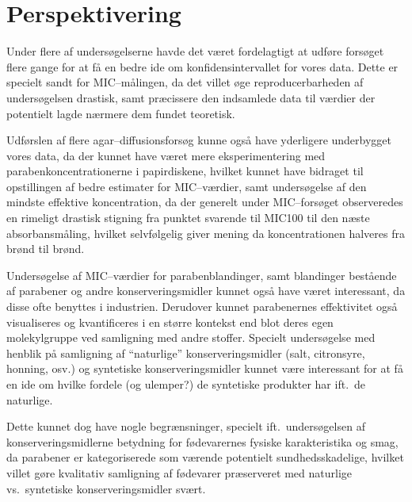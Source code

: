\section{Perspektivering}
Under flere af undersøgelserne havde det været fordelagtigt at udføre forsøget flere gange for at få en bedre ide om konfidensintervallet for vores data. Dette er specielt sandt for MIC--målingen, da det villet øge reproducerbarheden af undersøgelsen drastisk, samt præcissere den indsamlede data til værdier der potentielt lagde nærmere dem fundet teoretisk.

Udførslen af flere agar--diffusionsforsøg kunne også have yderligere underbygget vores data, da der kunnet have været mere eksperimentering med parabenkoncentrationerne i papirdiskene, hvilket kunnet have bidraget til opstillingen af bedre estimater for MIC--værdier, samt undersøgelse af den mindste effektive koncentration, da der generelt under MIC--forsøget observeredes en rimeligt drastisk stigning fra punktet svarende til MIC100 til den næste absorbansmåling, hvilket selvfølgelig giver mening da koncentrationen halveres fra brønd til brønd.

Undersøgelse af MIC--værdier for parabenblandinger, samt blandinger bestående af parabener og andre konserveringsmidler kunnet også have været interessant, da disse ofte benyttes i industrien. Derudover kunnet parabenernes effektivitet også visualiseres og kvantificeres i en større kontekst end blot deres egen molekylgruppe ved samligning med andre stoffer. Specielt undersøgelse med henblik på samligning af ``naturlige'' konserveringsmidler (salt, citronsyre, honning, osv.) og syntetiske konserveringsmidler kunnet være interessant for at få en ide om hvilke fordele (og ulemper?) de syntetiske produkter har ift.\ de naturlige.

Dette kunnet dog have nogle begrænsninger, specielt ift.\ undersøgelsen af konserveringsmidlerne betydning for fødevarernes fysiske karakteristika og smag, da parabener er kategoriserede som værende potentielt sundhedsskadelige, hvilket villet gøre kvalitativ samligning af fødevarer præserveret med naturlige vs.\ syntetiske konserveringsmidler svært.
